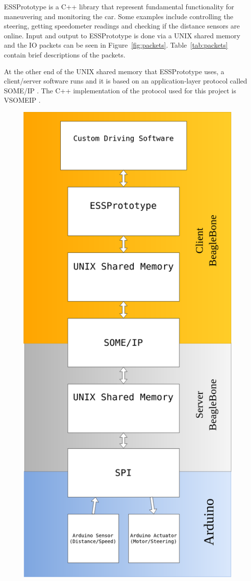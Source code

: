 \documentclass[11pt, titlepage]{article} %
\begin{document}
ESSPrototype is a C++ library that represent fundamental functionality for maneuvering and monitoring
the car. Some examples include controlling the steering, getting speedometer readings and checking if
the distance sensors are online. Input and output to ESSPrototype is done via a UNIX shared memory and
the IO packets can be seen in Figure~\ref{fig:packets}. Table~\ref{tab:packets} contain brief
descriptions of the packets.

At the other end of the UNIX shared memory that ESSPrototype uses, a client/server software
runs and it is based on an application-layer protocol called SOME/IP \cite{someip}. The C++ implementation of the 
protocol used for this project is VSOMEIP \cite{vsomeip}. 


\begin{figure}[H]
	\centering
   	\includegraphics[scale=0.25]{arch_bbb.png}

\end{figure}
\end{document}
